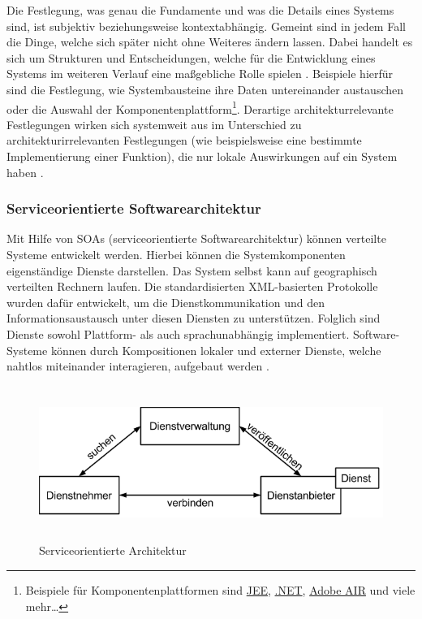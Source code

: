 Die Festlegung, was genau die Fundamente und was die Details eines Systems sind, ist subjektiv beziehungsweise kontextabhängig. Gemeint sind in jedem Fall die Dinge, welche sich später nicht ohne Weiteres ändern lassen. Dabei handelt es sich um Strukturen und Entscheidungen, welche für die Entwicklung eines Systems im weiteren Verlauf eine maßgebliche Rolle spielen \citereset \autocite[siehe][]{Fowler.2005}. Beispiele hierfür sind die Festlegung, wie Systembausteine ihre Daten untereinander austauschen oder die Auswahl der Komponentenplattform\footnote{Beispiele für Komponentenplattformen sind \href{http://www.oracle.com/technetwork/java/javaee}{JEE}, \href{http://www.microsoft.com/net}{.NET}, \href{http://www.adobe.com/at/products/air.html}{Adobe AIR} und viele mehr\ldots }. Derartige architekturrelevante Festlegungen wirken sich systemweit aus im Unterschied zu architekturirrelevanten Festlegungen (wie beispielsweise eine bestimmte Implementierung einer Funktion), die nur lokale Auswirkungen auf ein System haben \citereset \autocite[siehe][]{Bredemeyer.Malan.2004}.

\subsubsection{Serviceorientierte Softwarearchitektur}
\label{sec:2_Serviceorientierte_Softwarearchitektur}
Mit Hilfe von SOAs (serviceorientierte Softwarearchitektur) können verteilte Systeme entwickelt werden. Hierbei können die Systemkomponenten eigenständige Dienste darstellen. Das System selbst kann auf geographisch verteilten Rechnern laufen. Die standardisierten XML-basierten Protokolle wurden dafür entwickelt, um die Dienstkommunikation und den Informationsaustausch unter diesen Diensten zu unterstützen. Folglich sind Dienste sowohl Plattform- als auch sprachunabhängig implementiert. Software-Systeme können durch Kompositionen lokaler und externer Dienste, welche nahtlos miteinander interagieren, aufgebaut werden \citereset \autocite[siehe][S. 509-514]{Sommerville.2011}.

\begin{figure}[h]
\centering
\includegraphics[height=5.0cm]{images/soa.png}
\caption[
Serviceorientierte Architektur, Urldate: 04.2014 \newline
\small\texttt{\url{http://www.w3.org/2003/Talks/0521-hh-wsa/slide5-0.html}}
]{Serviceorientierte Architektur}
\label{fig:2_SOA}
\end{figure}

